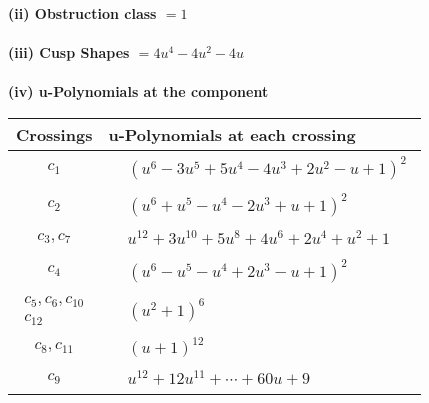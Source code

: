 \documentclass[1p]{elsarticle_modified}
\theoremstyle{definition}
\begin{document}
\flushleft \textbf{(ii) Obstruction class $= 1$}\\~\\
\flushleft \textbf{(iii) Cusp Shapes $= 4 u^4-4 u^2-4 u$}\\~\\
\newpage\renewcommand{\arraystretch}{1}
\flushleft \textbf{(iv) u-Polynomials at the component}\newline \\
\begin{tabular}{m{50pt}|m{274pt}}
Crossings & \hspace{64pt}u-Polynomials at each crossing \\
\hline $$\begin{aligned}c_{1}\end{aligned}$$&$\begin{aligned}
&(u^6-3 u^5+5 u^4-4 u^3+2 u^2- u+1)^2
\end{aligned}$\\
\hline $$\begin{aligned}c_{2}\end{aligned}$$&$\begin{aligned}
&(u^6+u^5- u^4-2 u^3+u+1)^2
\end{aligned}$\\
\hline $$\begin{aligned}c_{3},c_{7}\end{aligned}$$&$\begin{aligned}
&u^{12}+3 u^{10}+5 u^8+4 u^6+2 u^4+u^2+1
\end{aligned}$\\
\hline $$\begin{aligned}c_{4}\end{aligned}$$&$\begin{aligned}
&(u^6- u^5- u^4+2 u^3- u+1)^2
\end{aligned}$\\
\hline $$\begin{aligned}c_{5},c_{6},c_{10}\\c_{12}\end{aligned}$$&$\begin{aligned}
&(u^2+1)^6
\end{aligned}$\\
\hline $$\begin{aligned}c_{8},c_{11}\end{aligned}$$&$\begin{aligned}
&(u+1)^{12}
\end{aligned}$\\
\hline $$\begin{aligned}c_{9}\end{aligned}$$&$\begin{aligned}
&u^{12}+12 u^{11}+\cdots+60 u+9
\end{aligned}$\\
\hline
\end{tabular}\\~\\
\end{document}
